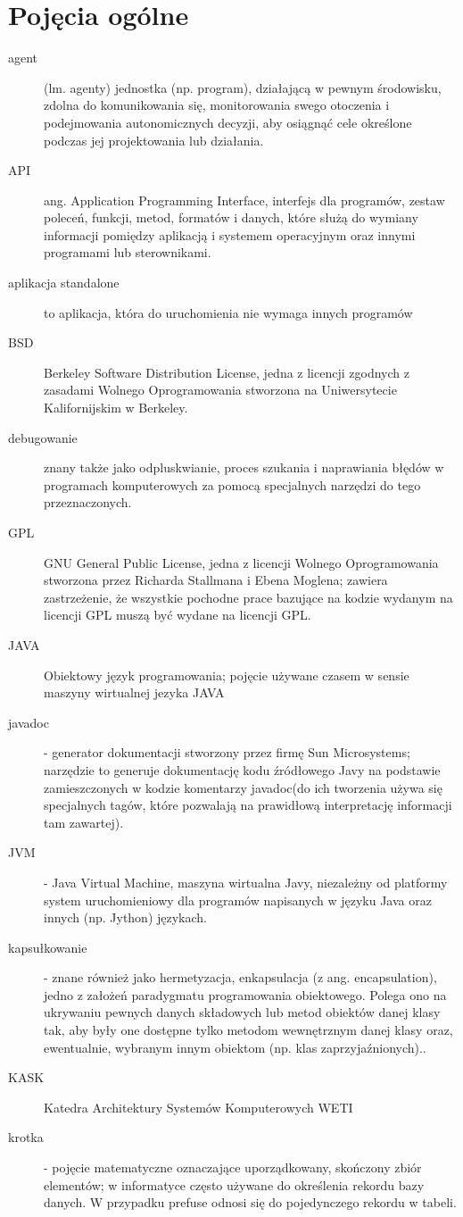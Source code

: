 \documentclass[a4paper,10pt,twoside]{article}
\begin{document}
\section{Pojęcia ogólne}
\begin{description}
	\item[agent] (lm. agenty) jednostka (np. program), działającą w pewnym środowisku, zdolna do komunikowania się, monitorowania swego otoczenia i podejmowania autonomicznych decyzji, aby osiągnąć cele określone podczas jej projektowania lub działania.
	\item[API] ang. Application Programming Interface, interfejs dla programów, zestaw poleceń, funkcji, metod, formatów i danych, które służą do wymiany informacji pomiędzy aplikacją i systemem operacyjnym oraz innymi programami lub sterownikami.
	\item[aplikacja standalone] to aplikacja, która do uruchomienia nie wymaga innych programów

	\item[BSD] Berkeley Software Distribution License, jedna z licencji zgodnych z zasadami Wolnego Oprogramowania stworzona na Uniwersytecie Kalifornijskim w Berkeley.
	\item[debugowanie] znany także jako odpluskwianie, proces szukania i naprawiania błędów	w programach komputerowych za pomocą specjalnych narzędzi do tego przeznaczonych.
	\item[GPL] GNU General Public License, jedna z licencji Wolnego Oprogramowania stworzona przez Richarda Stallmana i Ebena Moglena; zawiera zastrzeżenie, że wszystkie pochodne prace bazujące na kodzie wydanym na licencji GPL muszą być wydane na licencji GPL.

	\item[JAVA] Obiektowy język programowania; pojęcie używane czasem w sensie maszyny wirtualnej jezyka JAVA
	\item[javadoc] - generator dokumentacji stworzony przez firmę Sun Microsystems; narzędzie to generuje dokumentację kodu źródłowego Javy na podstawie zamieszczonych w kodzie komentarzy javadoc(do ich tworzenia używa się specjalnych tagów, które pozwalają na prawidłową interpretację informacji tam zawartej).
	\item[JVM] - Java Virtual Machine, maszyna wirtualna Javy, niezależny od platformy system uruchomieniowy dla programów napisanych w języku Java oraz innych (np. Jython) językach.

	\item[kapsułkowanie] - znane również jako hermetyzacja, enkapsulacja (z ang. encapsulation), jedno z założeń paradygmatu programowania obiektowego. Polega ono na ukrywaniu pewnych danych składowych lub metod obiektów danej klasy tak, aby były one dostępne tylko metodom wewnętrznym danej klasy oraz, ewentualnie, wybranym innym obiektom (np. klas zaprzyjaźnionych)..
	\item[KASK] Katedra Architektury Systemów Komputerowych WETI
	\item[krotka] - pojęcie matematyczne oznaczające uporządkowany, skończony zbiór elementów; w informatyce często używane do określenia rekordu bazy danych. W przypadku prefuse odnosi się do pojedynczego rekordu w tabeli.


\end{description}
\end{document}
